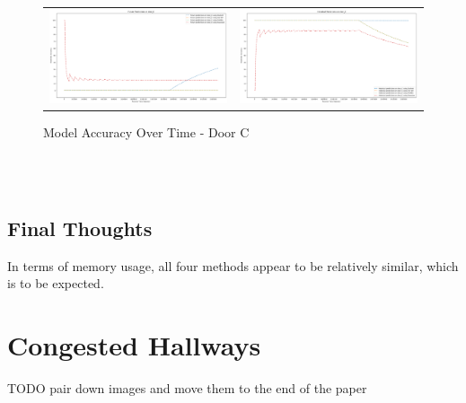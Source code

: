 \begin{figure}
  \begin{tabular}{cc}
    {\includegraphics[width = 3in]{images/results/Future_Predictions_on_door_C.png}} &
    {\includegraphics[width = 3in]{images/results/Historical_Predictions_on_door_C.png}} \\
  \end{tabular}
  \caption{Model Accuracy Over Time - Door C}
\end{figure}\\ \\

\subsection{ Final Thoughts }
In terms of memory usage, all four methods appear to be relatively similar, which is to be expected.

\section{ Congested Hallways }
TODO pair down images and move them to the end of the paper


\begin{table}[h!]
  \centering
  \caption{Hallway Trash Section 0}
\end{table}


